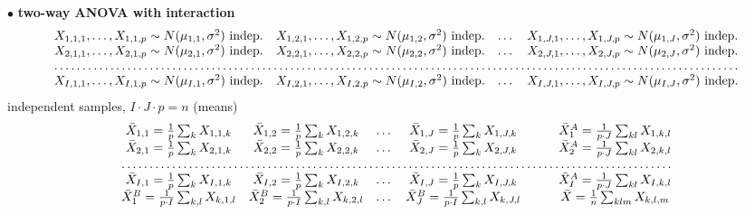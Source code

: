 \documentclass[twoside]{book}
\begin{document}
\pagestyle{empty}

\def\dr #1{\par\noindent $\bullet$ {\bf #1}}

\dr{two-way ANOVA with interaction}
\hspace*{+3mm}
\begin{multline*}\begin{matrix}
X_{1,1,1},\dots,X_{1,1,p}\sim N(\mu_{1,1},\sigma^2) \text{ indep.} & X_{1,2,1},\dots,X_{1,2,p}\sim N(\mu_{1,2},\sigma^2) \text{ indep.} &\dots & X_{1,J,1},\dots,X_{1,J,p}\sim N(\mu_{1,J},\sigma^2) \text{ indep.} \\
X_{2,1,1},\dots,X_{2,1,p}\sim N(\mu_{2,1},\sigma^2) \text{ indep.} & X_{2,2,1},\dots,X_{2,2,p}\sim N(\mu_{2,2},\sigma^2) \text{ indep.} &\dots & X_{2,J,1},\dots,X_{2,J,p}\sim N(\mu_{2,J},\sigma^2) \text{ indep.} \\
\hdotsfor{4} \\
X_{I,1,1},\dots,X_{I,1,p}\sim N(\mu_{I,1},\sigma^2) \text{ indep.} & X_{I,2,1},\dots,X_{I,2,p}\sim N(\mu_{I,2},\sigma^2) \text{ indep.} &\dots & X_{I,J,1},\dots,X_{I,J,p}\sim N(\mu_{I,J},\sigma^2) \text{ indep.}
\end{matrix}\end{multline*}
\hspace*{60mm} independent samples, $I\cdot J\cdot p =n$
\newline (means)
\begin{multline*}\begin{matrix}
\bar{X}_{1,1}=\frac1{p}\sum_{k} X_{1,1,k} & \bar{X}_{1,2}=\frac1{p}\sum_{k} X_{1,2,k} & \dots & \bar{X}_{1,J}=\frac1{p}\sum_{k} X_{1,J,k}& \qquad \bar{X}^{A}_{1}=\frac1{p\cdot J}\sum_{kl} X_{1,k,l} \\
\bar{X}_{2,1}=\frac1{p}\sum_{k} X_{2,1,k} & \bar{X}_{2,2}=\frac1{p}\sum_{k} X_{2,2,k} & \dots & \bar{X}_{2,J}=\frac1{p}\sum_{k} X_{2,J,k}& \qquad \bar{X}^{A}_{2}=\frac1{p\cdot J}\sum_{kl} X_{2,k,l} \\
\hdotsfor{5} \\
\bar{X}_{I,1}=\frac1{p}\sum_{k} X_{I,1,k} & \bar{X}_{I,2}=\frac1{p}\sum_{k} X_{I,2,k} & \dots & \bar{X}_{I,J}=\frac1{p}\sum_{k} X_{I,J,k}& \qquad \bar{X}^{A}_{I}=\frac1{p\cdot J}\sum_{kl} X_{I,k,l} \\
\bar{X}^{B}_{1}=\frac1{p\cdot I}\sum_{k,l} X_{k,1,l} & \bar{X}^{B}_{2}=\frac1{p\cdot I}\sum_{k,l} X_{k,2,l} & \dots & \bar{X}^{B}_{J}=\frac1{p\cdot I}\sum_{k,l} X_{k,J,l} & \qquad \bar{X}=\frac1{n}\sum_{klm} X_{k,l,m} \\
\end{matrix}\end{multline*}
\end{document}
